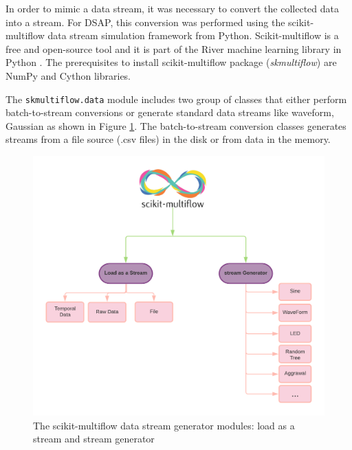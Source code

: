

In order to mimic a data stream, it was necessary to convert the collected data into a stream. For DSAP, this conversion was performed using the scikit-multiflow data stream simulation framework from Python.  Scikit-multiflow is a free and open-source tool and it is part of the River machine learning library in Python \cite{montiel2018scikit}. The prerequisites to install scikit-multiflow package (\textit{skmultiflow}) are NumPy and Cython libraries. 

The \texttt{skmultiflow.data} module includes two group of classes that either perform batch-to-stream conversions or generate standard data streams like waveform, Gaussian as shown in Figure \ref{sci}. The batch-to-stream conversion classes generates streams from a file source (.csv files) in the disk or from data in the memory.

\begin{figure}[!ht]
    \centering
    \includegraphics[width = 11 cm]{image/Chapters/Chapter5/multiflow.png}
    \caption{The scikit-multiflow data stream generator modules: load as a stream and stream generator}
    \label{sci}
    \end{figure}

